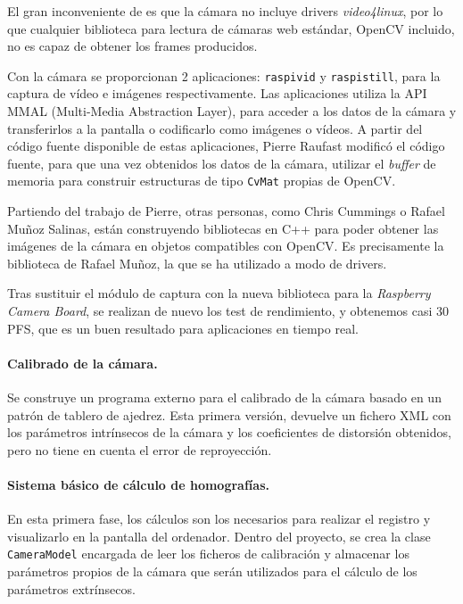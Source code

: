 El gran inconveniente de es que la cámara no incluye drivers \textit{video4linux}, por lo que cualquier biblioteca para lectura de cámaras web estándar, OpenCV incluido, no es capaz de obtener los frames producidos. 

Con la cámara se proporcionan 2 aplicaciones: \texttt{raspivid} y \texttt{raspistill}, para la captura de vídeo e imágenes respectivamente. Las aplicaciones utiliza la API MMAL (Multi-Media Abstraction Layer), para acceder a los datos de la cámara y transferirlos a la pantalla o codificarlo como imágenes o vídeos. A partir del código fuente disponible de estas aplicaciones, Pierre Raufast modificó el código fuente, para que una vez obtenidos los datos de la cámara, utilizar el \textit{buffer} de memoria para construir estructuras de tipo \texttt{CvMat} propias de OpenCV.

Partiendo del trabajo de Pierre, otras personas, como Chris Cummings o Rafael Muñoz Salinas, están construyendo bibliotecas en C++ para poder obtener las imágenes de la cámara en objetos compatibles con OpenCV. Es precisamente la biblioteca de Rafael Muñoz, la que se ha utilizado a modo de drivers. 

Tras sustituir el módulo de captura con la nueva biblioteca para la \textit{Raspberry Camera Board}, se realizan de nuevo los test de rendimiento, y obtenemos casi 30 PFS, que es un buen resultado para aplicaciones en tiempo real.

\paragraph{Calibrado de la cámara.}
Se construye un programa externo para el calibrado de la cámara basado en un patrón de tablero de ajedrez. Esta primera versión, devuelve un fichero XML con los parámetros intrínsecos de la cámara y los coeficientes de distorsión obtenidos, pero no tiene en cuenta el error de reproyección.

\paragraph{Sistema básico de cálculo de homografías.} 
En esta primera fase, los cálculos son los necesarios para realizar el registro y visualizarlo en la pantalla del ordenador. Dentro del proyecto, se crea la clase \texttt{CameraModel} encargada de leer los ficheros de calibración y almacenar los parámetros propios de la cámara que serán utilizados para el cálculo de los parámetros extrínsecos. 

